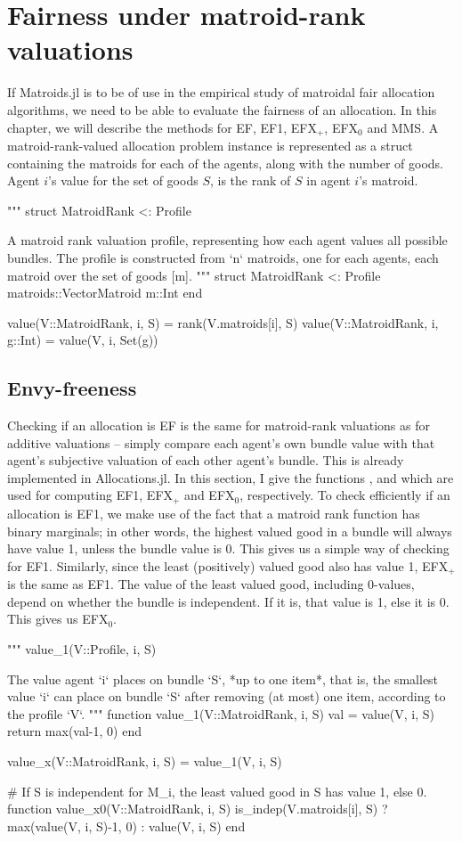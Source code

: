 \section{Fairness under matroid-rank valuations}
If Matroids.jl is to be of use in the empirical study of matroidal fair allocation algorithms, we need to be able to evaluate the fairness of an allocation. In this chapter, we will describe the methods for EF, EF1, EFX$_+$, EFX$_0$ and MMS. A matroid-rank-valued allocation problem instance is represented as a struct containing the matroids for each of the agents, along with the number of goods. Agent $i$'s value for the set of goods $S$, is the rank of $S$ in agent $i$'s matroid.
\begin{jllisting}
"""
    struct MatroidRank <: Profile

A matroid rank valuation profile, representing how each agent values all possible bundles. The profile is constructed from `n` matroids, one for each agents, each matroid over the set of goods [m]. 
"""
struct MatroidRank <: Profile
    matroids::Vector{Matroid}
    m::Int
end

value(V::MatroidRank, i, S) = rank(V.matroids[i], S)
value(V::MatroidRank, i, g::Int) = value(V, i, Set(g))
\end{jllisting}

\subsection*{Envy-freeness}
Checking if an allocation is EF is the same for matroid-rank valuations as for additive valuations -- simply compare each agent's own bundle value with that agent's subjective valuation of each other agent's bundle. This is already implemented in Allocations.jl. In this section, I give the functions ,  and  which are used for computing EF1, EFX$_+$ and EFX$_0$, respectively. To check efficiently if an allocation is EF1, we make use of the fact that a matroid rank function has binary marginals; in other words, the highest valued good in a bundle will always have value 1, unless the bundle value is 0. This gives us a simple way of checking for EF1. Similarly, since the least (positively) valued good also has value 1, EFX$_+$ is the same as EF1. The value of the least valued good, including 0-values, depend on whether the bundle is independent. If it is, that value is 1, else it is 0. This gives us EFX$_0$.

\begin{jllisting}
"""
    value_1(V::Profile, i, S)

The value agent `i` places on bundle `S`, *up to one item*, that is, the
smallest value `i` can place on bundle `S` after removing (at most) one item,
according to the profile `V`.
"""
function value_1(V::MatroidRank, i, S)
    val = value(V, i, S)
    return max(val-1, 0)
end

value_x(V::MatroidRank, i, S) = value_1(V, i, S)

# If S is independent for M_i, the least valued good in S has value 1, else 0.
function value_x0(V::MatroidRank, i, S)
    is_indep(V.matroids[i], S) ? max(value(V, i, S)-1, 0) : value(V, i, S)
end
\end{jllisting}

